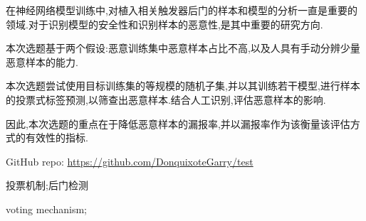 

\begin{zhaiyao}
\begin{spacing}{1.5}
{


在神经网络模型训练中,对植入相关触发器后门的样本和模型的分析一直是重要的领域.对于识别模型的安全性和识别样本的恶意性,是其中重要的研究方向.

本次选题基于两个假设:恶意训练集中恶意样本占比不高,以及人具有手动分辨少量恶意样本的能力.

本次选题尝试使用目标训练集的等规模的随机子集,并以其训练若干模型,进行样本的投票式标签预测,以筛查出恶意样本.结合人工识别,评估恶意样本的影响.

因此,本次选题的重点在于降低恶意样本的漏报率,并以漏报率作为该衡量该评估方式的有效性的指标.

GitHub repo: \url{https://github.com/DonquixoteGarry/test}
}
\end{spacing}
\end{zhaiyao}

\begin{guanjianci}
投票机制;后门检测
\end{guanjianci}



\begin{abstract}
\begin{spacing}{1.5}

While  Training

\end{spacing}
\end{abstract}


\begin{keywords}
voting mechanism;
\end{keywords} 